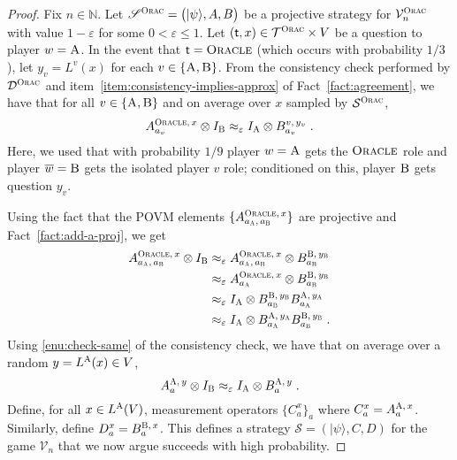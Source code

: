 \documentclass[11pt]{article}
\theoremstyle{definition}
\newcommand{\ket}[1]{|#1\rangle}
\newcommand{\Id}{\ensuremath{I}}
\newcommand{\N}{\ensuremath{\mathbb{N}}}
\newcommand{\eps}{\varepsilon}
\newcommand{\sampler}{\mathcal{S}}
\newcommand{\decider}{\mathcal{D}}
\newcommand{\verifier}{\mathcal{V}}
\newcommand{\strategy}{\mathscr{S}}
\newcommand{\type}{\mathcal{T}}
\newcommand{\gamestyle}[1]{\ensuremath{\textsc{#1}}\xspace}
\newcommand{\ora}{\gamestyle{Orac}}
\newcommand{\labelstyle}[1]{\ensuremath{\textsc{#1}}\xspace}
\newcommand{\tvarstyle}[1]{\mathsf{#1}}
\newcommand{\tvar}{\ensuremath{\tvarstyle{t}}}
\newcommand{\alice}{\labelstyle{A}}
\newcommand{\bob}{\labelstyle{B}}
\newcommand{\oracle}{\labelstyle{Oracle}}
\begin{document}
\begin{proof}
	Fix $n \in \N$.
  Let $\strategy^\ora = \bigl( \ket{\psi}, A, B \bigr)$ be a projective strategy
  for $\verifier^\ora_n$ with value $1 - \eps$ for some $0 < \eps \leq 1$.
  Let $(\tvar,x) \in \type^\ora \times V$ be a question to player $w=\alice$.
  In the event that $\tvar = \oracle$ (which occurs with probability $1/3$), let
  $y_v = L^v(x)$ for each $v \in \{\alice,\bob\}$.
  From the consistency check performed by $\decider^\ora$ and
  item~\ref{item:consistency-implies-approx} of Fact~\ref{fact:agreement}, we
  have that for all $v \in \{\alice,\bob\}$ and on average over $x$ sampled by
  $\sampler^\ora$,
  \begin{equation}
    \label{eq:oracle-1}
    A^{\oracle,\, x}_{a_v} \otimes \Id_\bob  \approx_\eps
    \Id_\alice \otimes B^{v,\, y_v}_{a_v}\;.
  \end{equation}     
  Here, we used that with probability $1/9$ player $w=\alice$ gets the $\oracle$
  role and player $\overline{w}=\bob$ gets the isolated player $v$ role;
  conditioned on this, player $\bob$ gets question $y_v$.
  
  Using the fact that the POVM elements $\{A^{\oracle,\, x}_{a_\alice,\,
    a_\bob}\}$ are projective and Fact~\ref{fact:add-a-proj}, we get
  \begin{equation}
    \label{eq:oracle-2}
    \begin{split}
      A^{\oracle,\, x}_{a_\alice,\, a_\bob} \otimes \Id_\bob
      & \approx_{\eps} A^{\oracle,\, x}_{a_\alice,\, a_\bob}  \otimes
      B^{\bob,\, y_\bob}_{a_\bob} \\
      &\approx_{\eps} A^{\oracle,\, x}_{a_\alice} \otimes
      B^{\bob,\, y_\bob}_{a_\bob} \\
      & \approx_\eps \Id_\alice \otimes
      B^{\bob,\, y_\bob}_{a_\bob} B^{\alice,\, y_\alice}_{a_\alice} \\
      & \approx_\eps \Id_\alice \otimes
      B^{\alice,\, y_\alice}_{a_\alice} B^{\bob,\, y_\bob}_{a_\bob}\;.
    \end{split}
  \end{equation}
  Using \cref{enu:check-same} of the consistency check, we have that on
  average over a random $y = L^\alice(x) \in V$,
  \begin{equation}
    \label{eq:oracle-3}
    A^{\alice,\, y}_{a} \otimes I_\bob \approx_\eps
    \Id_\alice \otimes B^{\alice,\, y}_{a}\;.
  \end{equation}
  Define, for all $x \in L^\alice(V)$, measurement operators $\{C^x_a\}_a$ where
  $C^x_a = A^{\alice,\, x}_a$.
  Similarly, define $D^x_a = B^{\bob,\, x}_a$.
  This defines a strategy $\strategy = (\ket{\psi},C,D)$ for the game
  $\verifier_n$ that we now argue succeeds with high probability.
    

\end{proof}
\end{document}
